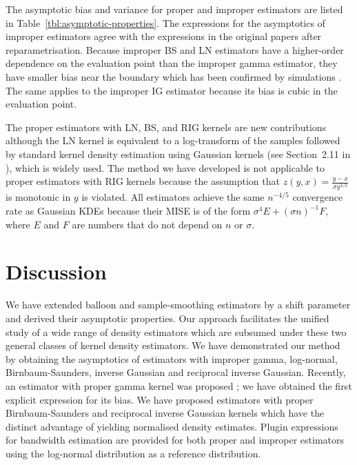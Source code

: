 The asymptotic bias and variance for proper and improper estimators are listed in Table~\ref{tbl:asymptotic-properties}. The expressions for the asymptotics of improper estimators agree with the expressions in the original papers after reparametrisation. Because improper BS and LN estimators have a higher-order dependence on the evaluation point than the improper gamma estimator, they have smaller bias near the boundary which has been confirmed by simulations \citep{Jin2003}. The same applies to the improper IG estimator because its bias is cubic in the evaluation point.

The proper estimators with LN, BS, and RIG kernels are new contributions although the LN kernel is equivalent to a log-transform of the samples followed by standard kernel density estimation using Gaussian kernels (see Section~2.11 in \citet{Silverman1986}), which is widely used. The method we have developed is not applicable to proper estimators with RIG kernels because the assumption that $z\left(y,x\right)=\frac{y-x}{\sigma y^{3/2}}$ is monotonic in $y$ is violated.  All estimators achieve the same $n^{-4/5}$ convergence rate as Gaussian KDEs because their MISE is of the form $\sigma^{4}E+\left(\sigma n\right)^{-1}F$, where $E$ and $F$ are numbers that do not depend on $n$ or $\sigma$.


\section{Discussion\label{sec:discussion}}

We have extended balloon and sample-smoothing estimators by a shift parameter and derived their asymptotic properties. Our approach facilitates the unified study of a wide range of density estimators which are subsumed under these two general classes of kernel density estimators. We have demonstrated our method by obtaining the asymptotics of estimators with improper gamma, log-normal, Birnbaum-Saunders, inverse Gaussian and reciprocal inverse Gaussian. Recently, an estimator with proper gamma kernel was proposed \citep{Jeon2014}; we have obtained the first explicit expression for its bias. We have proposed estimators with proper Birnbaum-Saunders and reciprocal inverse Gaussian kernels which have the distinct advantage of yielding normalised density estimates. Plugin expressions for bandwidth estimation are provided for both proper and improper estimators using the log-normal distribution as a reference distribution.

